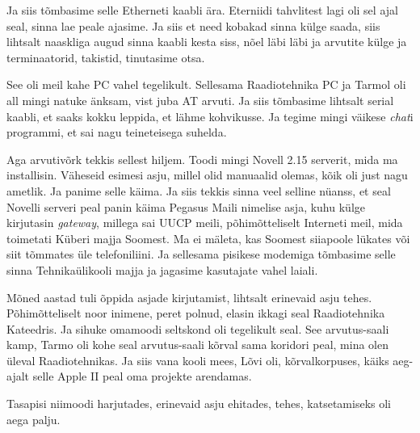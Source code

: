 Ja siis tõmbasime selle Etherneti kaabli ära. Eterniidi tahvlitest lagi oli sel ajal seal, sinna lae peale ajasime. Ja siis et need  kobakad sinna külge saada, siis lihtsalt naaskliga augud sinna kaabli  kesta siss, nõel läbi läbi ja arvutite külge ja terminaatorid, takistid, tinutasime otsa. 


See oli meil kahe PC vahel tegelikult. Sellesama Raadiotehnika PC ja Tarmol oli all mingi natuke änksam, vist juba AT arvuti. Ja siis tõmbasime lihtsalt serial kaabli, et saaks kokku leppida, et lähme kohvikusse. Ja tegime mingi väikese \emph{chat}i programmi, et sai nagu teineteisega suhelda. 

Aga arvutivõrk tekkis sellest hiljem. Toodi mingi Novell 2.15 serverit, mida ma installisin. Väheseid esimesi asju, millel olid manuaalid olemas, kõik oli just nagu ametlik. Ja panime selle käima. Ja siis tekkis sinna veel selline nüanss, et seal Novelli serveri peal panin käima Pegasus Maili nimelise asja, kuhu külge kirjutasin \emph{gateway}, millega sai UUCP meili, põhimõtteliselt Interneti meil, mida toimetati Küberi majja Soomest. Ma ei mäleta, kas Soomest siiapoole lükates või siit tõmmates üle telefoniliini. Ja sellesama pisikese modemiga tõmbasime selle sinna Tehnikaülikooli majja ja jagasime kasutajate vahel laiali.


Mõned aastad tuli õppida asjade kirjutamist, lihtsalt erinevaid asju tehes. Põhimõtteliselt noor inimene, peret polnud, elasin ikkagi seal Raadiotehnika Kateedris. Ja sihuke omamoodi seltskond oli tegelikult seal. See arvutus-saali kamp, Tarmo oli kohe seal arvutus-saali kõrval sama koridori peal, mina olen üleval Raadiotehnikas. Ja siis vana kooli mees, Lõvi oli, kõrvalkorpuses, käiks aeg-ajalt selle Apple II peal oma  projekte arendamas.

Tasapisi niimoodi harjutades, erinevaid asju ehitades, tehes,  katsetamiseks oli aega palju.


